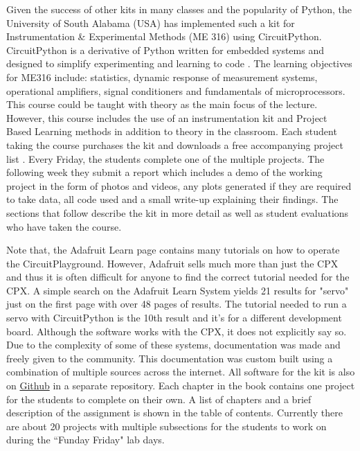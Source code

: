 Given the success of other kits in many classes and the popularity of
Python, the University of South Alabama (USA) has implemented such a
kit for Instrumentation \& Experimental Methods (ME 316) using
CircuitPython. CircuitPython is a derivative of Python written for
embedded systems and designed to simplify experimenting and learning
to code \cite{CircuitPython}. The learning objectives for ME316
include: statistics, dynamic response of measurement systems,
operational amplifiers, signal conditioners and fundamentals of
microprocessors. This course could be taught with theory as the main
focus of the lecture. However, this course includes the use of an
instrumentation kit and Project Based Learning methods in addition to
theory in the classroom. Each student taking the course purchases the
kit and downloads a free accompanying project
list \cite{Gitbook}. Every Friday, the students complete one of the multiple
projects. The following week they submit a report which includes a
demo of the working project in the form of photos and videos, any
plots generated if they are required to take data, all code used and a
small write-up explaining their findings. The sections that follow
describe the kit in more detail as well as student evaluations who
have taken the course.

Note that, the Adafruit Learn page contains many tutorials on how to operate the
CircuitPlayground\cite{Adafruit}. However, Adafruit sells much
more than just the CPX and thus it is often difficult for anyone to
find the correct tutorial needed for the CPX. A simple search on the
Adafruit Learn System yields 21 results for "servo" just on the first
page with over 48 pages of results. The tutorial needed to run a servo
with CircuitPython is the 10th result and it's for a different
development board. Although the software works with the CPX, it does
not explicitly say so. Due to the complexity of some of these systems,
documentation was made and freely given to the
community\cite{Gitbook}. This documentation was custom built using a
combination of multiple sources across the internet. All software for
the kit is also
on \href{www.github.com/cmontalvo251/Microcontrollers.git}{Github} in
a separate repository. Each chapter in the book contains one project for the
students to complete on their own. A list of chapters and a brief
description of the assignment is shown in the table of
contents. Currently there are about 20 projects with multiple
subsections for the students to work on during the ``Funday Friday"
lab days. 

